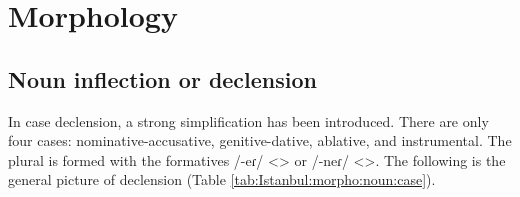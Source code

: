 \begin{table}[H]
	\centering 
	\caption{Absence of word-initial Classical Armenian /ʁ/ <> in the Istanbul dialect}
	\label{tab:Istanbul:phonology:change:gh}
\end{table}



\section{Morphology}
\subsection{Noun inflection or declension}\label{sec:Istanbul:morpho:noun}
In case declension, a strong simplification has been introduced. There are only four cases: nominative-accusative, genitive-dative, ablative, and instrumental. The plural is formed with the formatives /-eɾ/ <> or /-neɾ/ <>. The following is the general picture of declension (Table \ref{tab:Istanbul:morpho:noun:case}). 



\begin{adjarianpage}\label{page:251}\end{adjarianpage}%



